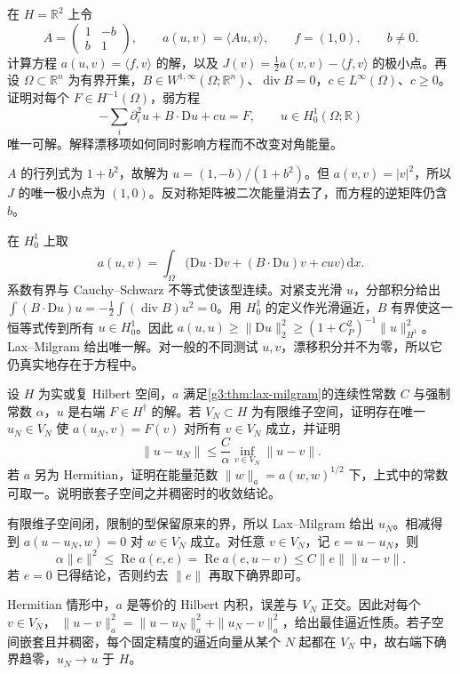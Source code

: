\BookExercises

\begin{exercise}\label{g3:ex:skew-energy-equation}
	在 \(H=\mathbb R^2\) 上令
	\[
		A=\begin{pmatrix}1&-b\\ b&1\end{pmatrix},\qquad
		a(u,v)=\langle Au,v\rangle,\qquad f=(1,0),\qquad b\ne0.
	\]
	计算方程 \(a(u,v)=\langle f,v\rangle\) 的解，以及 \(J(v)=\tfrac12a(v,v)-\langle f,v\rangle\) 的极小点。再设 \(\Omega\subset\mathbb R^n\) 为有界开集，\(B\in W^{1,\infty}(\Omega;\mathbb R^n)\)、\(\operatorname{div}B=0\)，\(c\in L^\infty(\Omega)\)、\(c\ge0\)。证明对每个 \(F\in H^{-1}(\Omega)\)，弱方程
	\[
		-\sum_i\partial_i^2u+B\cdot\mathrm Du+cu=F,
		\qquad u\in H_0^1(\Omega;\mathbb R)
	\]
	唯一可解。解释漂移项如何同时影响方程而不改变对角能量。
\end{exercise}
\begin{solution}
	\(A\) 的行列式为 \(1+b^2\)，故解为
	\(u=(1,-b)/(1+b^2)\)。但 \(a(v,v)=|v|^2\)，所以 \(J\) 的唯一极小点为 \((1,0)\)。反对称矩阵被二次能量消去了，而方程的逆矩阵仍含 \(b\)。

	在 \(H_0^1\) 上取
	\[
		a(u,v)=\int_\Omega\bigl(\mathrm Du\cdot\mathrm Dv+(B\cdot\mathrm Du)v+cuv\bigr)\,\mathrm dx.
	\]
	系数有界与 Cauchy--Schwarz 不等式使该型连续。对紧支光滑 \(u\)，分部积分给出
	\(\int(B\cdot\mathrm Du)u=-\tfrac12\int(\operatorname{div}B)u^2=0\)。用 \(H_0^1\) 的定义作光滑逼近，\(B\) 有界使这一恒等式传到所有 \(u\in H_0^1\)。因此
	\(a(u,u)\ge\|\mathrm Du\|_2^2\ge(1+C_P^2)^{-1}\|u\|_{H^1}^2\)。Lax--Milgram 给出唯一解。对一般的不同测试 \(u,v\)，漂移积分并不为零，所以它仍真实地存在于方程中。
\end{solution}

\begin{exercise}\label{g3:ex:galerkin-energy-approximation}
	设 \(H\) 为实或复 Hilbert 空间，\(a\) 满足\cref{g3:thm:lax-milgram}的连续性常数 \(C\) 与强制常数 \(\alpha\)，\(u\) 是右端 \(F\in H^\dagger\) 的解。若 \(V_N\subset H\) 为有限维子空间，证明存在唯一 \(u_N\in V_N\) 使 \(a(u_N,v)=F(v)\) 对所有 \(v\in V_N\) 成立，并证明
	\[
		\|u-u_N\|\le\frac C\alpha\inf_{v\in V_N}\|u-v\|.
	\]
	若 \(a\) 另为 Hermitian，证明在能量范数 \(\|w\|_a=a(w,w)^{1/2}\) 下，上式中的常数可取一。说明嵌套子空间之并稠密时的收敛结论。
\end{exercise}
\begin{solution}
	有限维子空间闭，限制的型保留原来的界，所以 Lax--Milgram 给出 \(u_N\)。相减得到 \(a(u-u_N,w)=0\) 对 \(w\in V_N\) 成立。对任意 \(v\in V_N\)，记 \(e=u-u_N\)，则
	\[
		\alpha\|e\|^2\le\operatorname{Re}a(e,e)
		=\operatorname{Re}a(e,u-v)\le C\|e\|\|u-v\|.
	\]
	若 \(e=0\) 已得结论，否则约去 \(\|e\|\) 再取下确界即可。

	Hermitian 情形中，\(a\) 是等价的 Hilbert 内积，误差与 \(V_N\) 正交。因此对每个 \(v\in V_N\)，
	\(\|u-v\|_a^2=\|u-u_N\|_a^2+\|u_N-v\|_a^2\)，给出最佳逼近性质。若子空间嵌套且并稠密，每个固定精度的逼近向量从某个 \(N\) 起都在 \(V_N\) 中，故右端下确界趋零，\(u_N\to u\) 于 \(H\)。
\end{solution}

